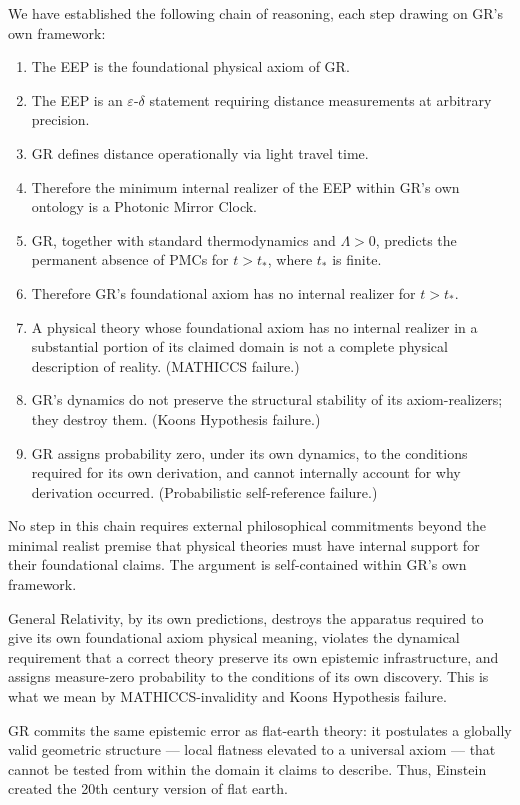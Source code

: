 \documentclass[11pt,a4paper]{article}
\begin{document}
We have established the following chain of reasoning, each step drawing on GR's own
framework:

\begin{enumerate}
\item The EEP is the foundational physical axiom of GR.
\item The EEP is an $\varepsilon$-$\delta$ statement requiring distance measurements
      at arbitrary precision.
\item GR defines distance operationally via light travel time.
\item Therefore the minimum internal realizer of the EEP within GR's own ontology is
      a Photonic Mirror Clock.
\item GR, together with standard thermodynamics and $\Lambda > 0$, predicts the
      permanent absence of PMCs for $t > t_*$, where $t_*$ is finite.
\item Therefore GR's foundational axiom has no internal realizer for $t > t_*$.
\item A physical theory whose foundational axiom has no internal realizer in a
      substantial portion of its claimed domain is not a complete physical description
      of reality. (MATHICCS failure.)
\item GR's dynamics do not preserve the structural stability of its axiom-realizers;
      they destroy them. (Koons Hypothesis failure.)
\item GR assigns probability zero, under its own dynamics, to the conditions required
      for its own derivation, and cannot internally account for why derivation
      occurred. (Probabilistic self-reference failure.)
\end{enumerate}

No step in this chain requires external philosophical commitments beyond the minimal
realist premise that physical theories must have internal support for their foundational
claims. The argument is self-contained within GR's own framework.

General Relativity, by its own predictions, destroys the apparatus required to give
its own foundational axiom physical meaning, violates the dynamical requirement that
a correct theory preserve its own epistemic infrastructure, and assigns measure-zero
probability to the conditions of its own discovery. This is what we mean by
MATHICCS-invalidity and Koons Hypothesis failure.

GR commits the same epistemic error as flat-earth theory: it postulates a globally valid geometric structure --- local flatness elevated to a universal axiom --- that cannot be tested from within the domain it claims to describe. Thus, Einstein created the 20th century version of flat earth.
\end{document}
